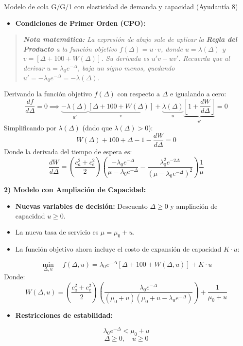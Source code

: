 \begin{ejercicio}{Modelo de cola G/G/1 con elasticidad de demanda y capacidad (Ayudantía 8)}
\begin{itemize}
  \item \textbf{Condiciones de Primer Orden (CPO):}
\end{itemize}
    \begin{quotation}
    \small \textit{\textbf{Nota matemática:} La expresión de abajo sale de aplicar la \textbf{Regla del Producto} a la función objetivo $f(\Delta) = u \cdot v$, donde $u = \lambda(\Delta)$ y $v = [\Delta + 100 + W(\Delta)]$. Su derivada es $u'v + uv'$. Recuerda que al derivar $u = \lambda_0 e^{-\Delta}$, baja un signo menos, quedando $u' = -\lambda_0 e^{-\Delta} = -\lambda(\Delta)$.}
    \end{quotation}
    Derivando la función objetivo $f(\Delta)$ con respecto a $\Delta$ e igualando a cero:
    $$\frac{df}{d\Delta} = 0 \implies \underbrace{-\lambda(\Delta)}_{u'} \underbrace{\left[ \Delta + 100 + W(\Delta) \right]}_{v} + \underbrace{\lambda(\Delta)}_{u} \underbrace{\left[ 1 + \frac{dW}{d\Delta} \right]}_{v'} = 0$$
    Simplificando por $\lambda(\Delta)$ (dado que $\lambda(\Delta) > 0$):
    $$W(\Delta) + 100 + \Delta - 1 - \frac{dW}{d\Delta} = 0$$
    Donde la derivada del tiempo de espera es:
    $$\frac{dW}{d\Delta} = \left( \frac{c_a^2 + c_e^2}{2} \right) \left( \frac{-\lambda_0 e^{-\Delta}}{\mu - \lambda_0 e^{-\Delta}} - \frac{\lambda_0^2 e^{-2\Delta}}{(\mu - \lambda_0 e^{-\Delta})^2} \right) \frac{1}{\mu}$$

\textbf{2) Modelo con Ampliación de Capacidad:}
\begin{itemize}
  \item \textbf{Nuevas variables de decisión:} Descuento $\Delta \ge 0$ y ampliación de capacidad $u \ge 0$.
  \item La nueva tasa de servicio es $\mu = \mu_0 + u$.
  \item La función objetivo ahora incluye el costo de expansión de capacidad $K \cdot u$:
\end{itemize}
    $$\min_{\Delta, u} \quad f(\Delta, u) = \lambda_0 e^{-\Delta} \left[ \Delta + 100 + W(\Delta, u) \right] + K \cdot u$$
    Donde:
    $$W(\Delta, u) = \left( \frac{c_a^2 + c_e^2}{2} \right) \left( \frac{\lambda_0 e^{-\Delta}}{(\mu_0 + u)(\mu_0 + u - \lambda_0 e^{-\Delta})} \right) + \frac{1}{\mu_0 + u}$$
\begin{itemize}
  \item \textbf{Restricciones de estabilidad:}
\end{itemize}
    $$\lambda_0 e^{-\Delta} < \mu_0 + u$$
    $$\Delta \ge 0, \quad u \ge 0$$
\end{ejercicio}

